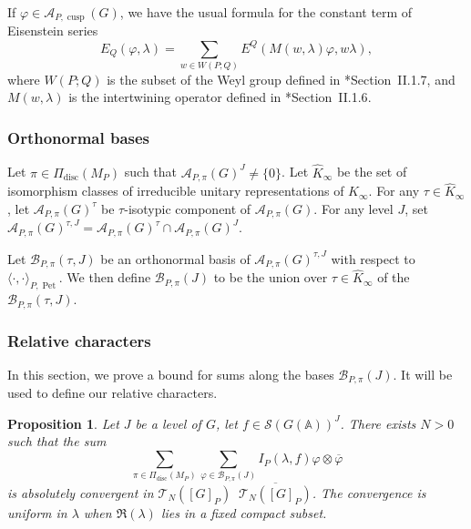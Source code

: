 \documentclass[letterpaper,11pt]{amsart}
\newcommand{\bA}{\mathbb{A}}
\newcommand{\cA}{\mathcal{A}}
\newcommand{\cB}{\mathcal{B}}
\newcommand{\cS}{\mathcal{S}}
\newcommand{\cT}{\mathcal{T}}
\newcommand{\<}{\negthickspace}
\DeclareMathOperator{\disc}{disc}
\DeclareMathOperator{\Pet}{Pet}
\DeclareMathOperator{\cusp}{cusp}
\DeclareMathOperator{\otimeshat}{\widehat{\otimes}}
\theoremstyle{definition}
\theoremstyle{plain}
\newtheorem{prop}[definition]{Proposition}
\theoremstyle{remark}
\numberwithin{equation}{section}
\begin{document}
If $\varphi \in \cA_{P,\cusp}(G)$, we have the usual formula for the constant term of Eisenstein series
\begin{equation}
    \label{eq:constant_term_Eisenstein}
    E_Q(\varphi,\lambda)=\sum_{w \in W(P;Q)} E^Q(M(w,\lambda) \varphi,w \lambda),
\end{equation}
where $W(P;Q)$ is the subset of the Weyl group defined in \cite{MW95}*{Section~II.1.7}, and $M(w,\lambda)$ is the intertwining operator defined in \cite{MW95}*{Section~II.1.6}.


\subsubsection{Orthonormal bases}
\label{subsec:bases}
Let $\pi \in \Pi_{\disc}(M_P)$ such that $\cA_{P,\pi}(G)^J \neq \{0\}$. Let $\widehat{K}_\infty$ be the set of isomorphism classes of irreducible unitary representations of $K_\infty$. For any $\tau \in \widehat{K}_\infty$, let $\cA_{P,\pi}(G)^\tau$ be $\tau$-isotypic component of $\cA_{P,\pi}(G)$. For any level $J$, set $    \cA_{P,\pi}(G)^{\tau,J}=\cA_{P,\pi}(G)^{\tau} \cap \cA_{P,\pi}(G)^{J}$.

Let $\cB_{P,\pi}(\tau,J)$ be an orthonormal basis of $\cA_{P,\pi}(G)^{\tau,J}$ with respect to $\langle \cdot,\cdot \rangle_{P,\Pet}$. We then define $\cB_{P,\pi}(J)$ to be the union over $\tau \in \widehat{K}_\infty$ of the $\cB_{P,\pi}(\tau,J)$. 


\subsubsection{Relative characters}
In this section, we prove a bound for sums along the bases $\cB_{P,\pi}(J)$. It will be used to define our relative characters. 


    \begin{prop}
        \label{prop:strong_K_basis}
        Let $J$ be a level of $G$, let $f \in \cS(G(\bA))^J$. There exists $N>0$ such that the sum 
        \[
            \sum_{\pi \in \Pi_{\disc}(M_P)} \sum_{\varphi \in \cB_{P, \pi}(J)} I_P(\lambda, f) \varphi
            \otimes \overline{\varphi}
            \]
            is absolutely convergent in $\cT_N([G]_P) \otimeshat \overline{\cT_N([G]_P)}$. The convergence is uniform in $\lambda$ when $\Re(\lambda)$ lies in a fixed compact subset.
    \end{prop}
    
\end{document}
